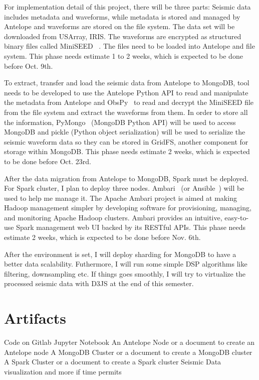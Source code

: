 \documentclass{acm_proc_article-sp}
\begin{document}
For implementation detail of this project, there will be three parts:
Seismic data includes metadata and waveforms, while metadata is stored and managed by Antelope and waveforms are stored on the file system. The data set will be downloaded from USArray, IRIS. The waveforms are encrypted as structured binary files called MiniSEED ~\cite{MiniSeed}. The files need to be loaded into Antelope and file system. This phase needs estimate 1 to 2 weeks, which is expected to be done before Oct. 9th.

To extract, transfer and load the seismic data from Antelope to MongoDB, tool needs to be developed to use the Antelope Python API to read and manipulate the metadata from Antelope and ObsPy~\cite{ObsPy} to read and decrypt the MiniSEED file from the file system and extract the waveforms from them. In order to store all the information, PyMongo~\cite{PyMongo} (MongoDB Python API) will be used to access MongoDB and pickle (Python object serialization) will be used to serialize the seismic waveform data so they can be stored in GridFS, another component for storage within MongoDB. This phase needs estimate 2 weeks, which is expected to be done before Oct. 23rd.

After the data migration from Antelope to MongoDB, Spark must be deployed. For Spark cluster, I plan to deploy three nodes. Ambari~\cite{AboutAmbari} (or Ansible~\cite{Ansible}) will be used to help me manage it. The Apache Ambari project is aimed at making Hadoop management simpler by developing software for provisioning, managing, and monitoring Apache Hadoop clusters. Ambari provides an intuitive, easy-to-use Spark management web UI backed by its RESTful APIs. This phase needs estimate 2 weeks, which is expected to be done before Nov. 6th.
 
After the environment is set, I will deploy sharding for MongoDB to have a better data scalability. Futhermore, I will run some simple DSP algorithms like filtering, downsampling etc. If things goes smoothly, I will try to virtualize the processed seismic data with D3JS at the end of this semester.


\section{Artifacts}
Code on Gitlab
Jupyter Notebook
An Antelope Node or a document to create an Antelope node
A MongoDB Cluster or a document to create a MongoDB cluster
A Spark Cluster or a document to create a Spark cluster
Seismic Data visualization and more if time permits




\end{document}
